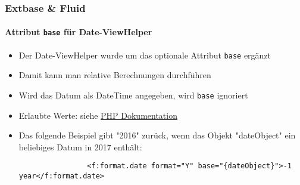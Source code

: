 
\begin{frame}[fragile]
	\frametitle{Extbase \& Fluid}
	\framesubtitle{Attribut \texttt{base} für Date-ViewHelper}


	\begin{itemize}

		\item Der Date-ViewHelper wurde um das optionale Attribut \texttt{base} ergänzt
		\item Damit kann man relative Berechnungen durchführen
		\item Wird das Datum als DateTime angegeben, wird \texttt{base} ignoriert
		\item Erlaubte Werte: siehe \href{http://www.php.net/manual/en/datetime.formats.relative.php}{PHP Dokumentation}
		\item Das folgende Beispiel gibt "2016" zurück, wenn das Objekt "dateObject" ein beliebiges Datum in 2017 enthält:

			\begin{lstlisting}
				<f:format.date format="Y" base="{dateObject}">-1 year</f:format.date>
			\end{lstlisting}

	\end{itemize}

\end{frame}


